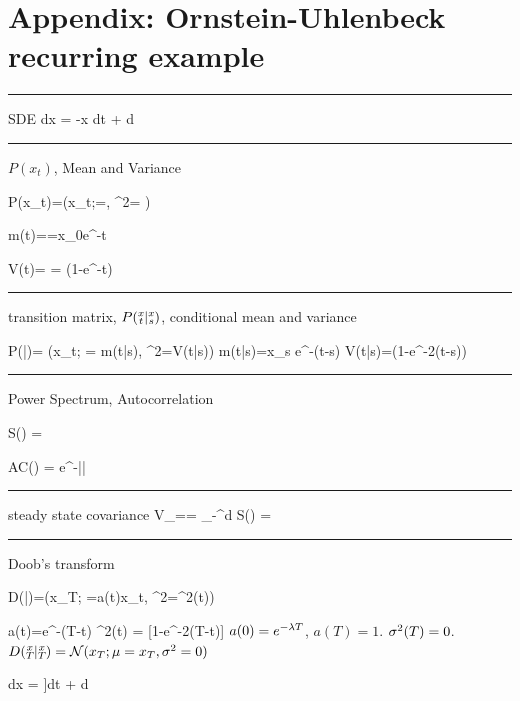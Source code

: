 \section{Appendix: Ornstein-Uhlenbeck
recurring example}

\hrule
SDE
\beq
dx = -\lam x dt + d\rvB
\eeq
\hrule
\noindent$P(x_t)$, Mean and Variance

\beq
P(x_t)=\caln(x_t;\mu=,
\s^2= )
\eeq

\beq
m(t)==x_0e^{-\lam t}
\eeq

\beq
V(t)=
 = (1-e^{-\lam t})
\eeq



\hrule
\noindent transition  matrix, $P({\substack{x\\t}}|{\substack{x\\s}})$, conditional mean and variance

\beq
P(|)= \caln(x_t; \mu= m(t|s), \s^2=V(t|s))
\eeq
\beq
m(t|s)=x_s e^{-\lam (t-s)}
\eeq
\beq
V(t|s)=(1-e^{-2\lam (t-s)})
\eeq
\hrule\noindent Power Spectrum, Autocorrelation

\beq
S(\omega) =
\eeq

\beq AC(\tau) =
e^{-\lam|\tau|}
\eeq

\hrule\noindent steady state covariance
\beq
V_\infty==
\int_{-\infty}^{\infty}d\omega\; S(\omega) = 
\eeq

\hrule \noindent Doob's transform

\beq
D(|)=\caln(x_T; \mu=a(t)x_t, \s^2=\sigma^2(t))
\eeq

\beq
a(t)=e^{-\lam(T-t)}
\eeq
\beq
\s^2(t) = [1-e^{-2\lam(T-t)}]
\eeq
$a(0)=e^{-\lambda T}$, $a(T)=1$. $\sigma^2(T)=0$.
$D({\substack{x\\T}}|{\substack{x\\T}})=
{\cal N}(x_T; \mu=x_T, \sigma^2=0)$


\beq
dx = \left[
-\lam x+ \frac{qa}{\s^2}[x_T-ax]
\right]dt + d\rvB
\eeq
